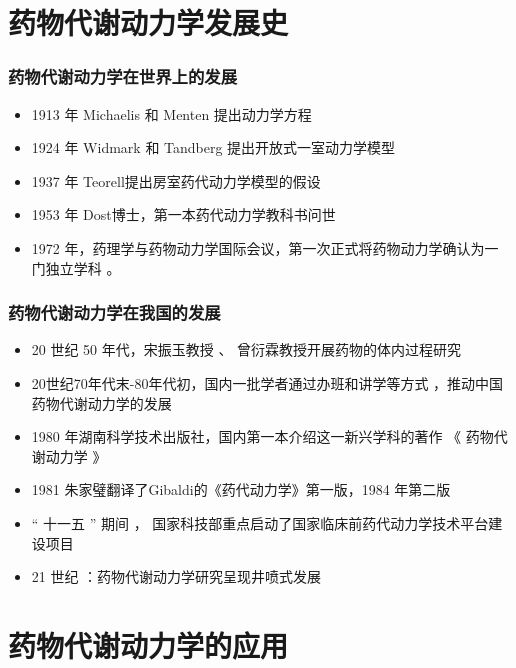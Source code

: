 \documentclass[dvipsnames, svgnames, x11names]{beamer}
\begin{document}
\section{药物代谢动力学发展史}


\begin{frame}
	\frametitle{药物代谢动力学在世界上的发展}
	\begin{itemize}
	  \item 1913 年 Michaelis 和 Menten 提出动力学方程
	  \item 1924 年 Widmark 和 Tandberg 提出开放式一室动力学模型
	  \item 1937 年 Teorell提出房室药代动力学模型的假设
	  \item 1953 年 Dost博士，第一本药代动力学教科书问世
	  \item 1972 年，药理学与药物动力学国际会议，第一次正式将药物动力学确认为一门独立学科 。
	\end{itemize}
\end{frame}



\begin{frame}
	\frametitle{药物代谢动力学在我国的发展}
	\begin{itemize}
	  \item 20 世纪 50 年代，宋振玉教授 、 曾衍霖教授开展药物的体内过程研究
	  \item 20世纪70年代末-80年代初，国内一批学者通过办班和讲学等方式 ，推动中国药物代谢动力学的发展
	  \item 1980 年湖南科学技术出版社，国内第一本介绍这一新兴学科的著作 《 药物代谢动力学 》
	  \item 1981 朱家璧翻译了Gibaldi的《药代动力学》第一版，1984 年第二版
	  \item “ 十一五 ” 期间 ， 国家科技部重点启动了国家临床前药代动力学技术平台建设项目
	  \item 21 世纪 ：药物代谢动力学研究呈现井喷式发展
	\end{itemize}
\end{frame}


\section{药物代谢动力学的应用}
	
\end{document}
